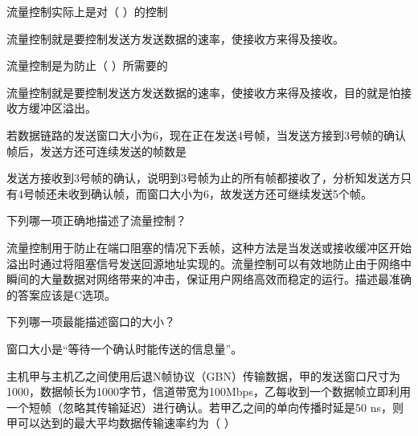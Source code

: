 \question 流量控制实际上是对（ ）的控制
\par{}
\begin{solution}流量控制就是要控制发送方发送数据的速率，使接收方来得及接收。
\end{solution}
\question 流量控制是为防止（ ）所需要的
\par{}
\begin{solution}流量控制就是要控制发送方发送数据的速率，使接收方来得及接收，目的就是怕接收方缓冲区溢出。
\end{solution}
\question 若数据链路的发送窗口大小为6，现在正在发送4号帧，当发送方接到3号帧的确认帧后，发送方还可连续发送的帧数是
\par{}
\begin{solution}发送方接收到3号帧的确认，说明到3号帧为止的所有帧都接收了，分析知发送方只有4号帧还未收到确认帧，而窗口大小为6，故发送方还可继续发送5个帧。
\end{solution}
\question 下列哪一项正确地描述了流量控制？
\par{}
\begin{solution}流量控制用于防止在端口阻塞的情况下丢帧，这种方法是当发送或接收缓冲区开始溢出时通过将阻塞信号发送回源地址实现的。流量控制可以有效地防止由于网络中瞬间的大量数据对网络带来的冲击，保证用户网络高效而稳定的运行。描述最准确的答案应该是C选项。
\end{solution}
\question 下列哪一项最能描述窗口的大小？
\par{}
\begin{solution}窗口大小是``等待一个确认时能传送的信息量''。
\end{solution}
\question 主机甲与主机乙之间使用后退N帧协议（GBN）传输数据，甲的发送窗口尺寸为1000，数据帧长为1000字节，信道带宽为100Mbps，乙每收到一个数据帧立即利用一个短帧（忽略其传输延迟）进行确认。若甲乙之间的单向传播时延是50
ns，则甲可以达到的最大平均数据传输速率约为（ ）
\par{}
